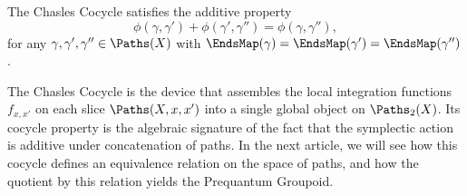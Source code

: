 \begin{article}
  \begin{proposition}
    The Chasles Cocycle satisfies the additive property
    \[
      \phi(\gamma,\gamma') + \phi(\gamma',\gamma'') = \phi(\gamma,\gamma''),
      \]%
    for any $\gamma,\gamma',\gamma'' \in \Paths(X)$ with
    $\EndsMap(\gamma) = \EndsMap(\gamma') = \EndsMap(\gamma'')$.
  \end{proposition}
  
  The Chasles Cocycle is the device that assembles the local integration
  functions $f_{x,x'}$ on each slice $\Paths(X,x,x')$
  into a single global object on $\Paths_2(X)$.
  Its cocycle property is the algebraic signature of the fact
  that the symplectic action is additive under concatenation of paths.
  In the next article,
  we will see how this cocycle defines an equivalence relation
  on the space of paths,
  and how the quotient by this relation yields the
  Prequantum Groupoid.
\end{article}

